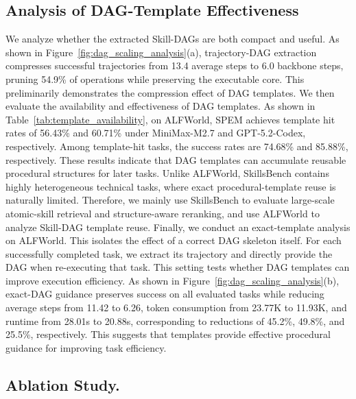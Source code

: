 \documentclass[letterpaper]{article} %
\newcommand{\model}{\textsc{SPEM}}
\begin{document}
\subsection{Analysis of DAG-Template Effectiveness}
We analyze whether the extracted Skill-DAGs are both compact and useful.
As shown in Figure~\ref{fig:dag_scaling_analysis}(a), trajectory-DAG extraction
compresses successful trajectories from 13.4 average steps to 6.0 backbone
steps, pruning 54.9\% of operations while preserving the executable core.
This preliminarily demonstrates the compression effect of DAG templates.
We then evaluate the availability and effectiveness of DAG templates.
As shown in Table~\ref{tab:template_availability}, on ALFWorld, \model{}
achieves template hit rates of 56.43\% and 60.71\% under MiniMax-M2.7 and
GPT-5.2-Codex, respectively. Among template-hit tasks, the success rates are
74.68\% and 85.88\%, respectively. These results indicate that DAG templates can
accumulate reusable procedural structures for later tasks. Unlike ALFWorld,
SkillsBench contains highly heterogeneous technical tasks, where exact
procedural-template reuse is naturally limited. Therefore, we mainly use
SkillsBench to evaluate large-scale atomic-skill retrieval and structure-aware
reranking, and use ALFWorld to analyze Skill-DAG template reuse.
Finally, we conduct an exact-template analysis on ALFWorld. This isolates the effect of a correct DAG skeleton itself. For each successfully completed task, we
extract its trajectory and directly provide the DAG when re-executing
that task. This setting tests whether DAG templates can improve execution
efficiency. As shown in Figure~\ref{fig:dag_scaling_analysis}(b), exact-DAG
guidance preserves success on all evaluated tasks while reducing average steps
from 11.42 to 6.26, token consumption from 23.77K to 11.93K, and runtime from
28.01s to 20.88s, corresponding to reductions of 45.2\%, 49.8\%, and 25.5\%,
respectively. This suggests that templates provide effective procedural guidance
for improving task efficiency.




\subsection{Ablation Study.}
\end{document}
